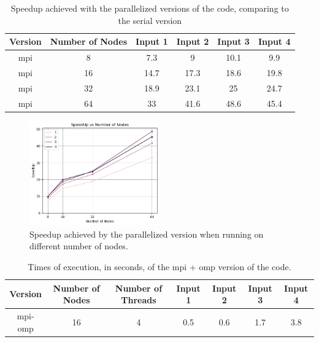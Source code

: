 \documentclass{article}
\begin{document}
\begin{table}[h!]
	\centering
	\begin{tabular}{||c c c c c c||} 
	 \hline
	 Version & Number of Nodes & Input 1 & Input 2 & Input 3 & Input 4\\ [0.5ex] 
	 \hline\hline
	 mpi & 8 & 7.3 & 9 & 10.1 & 9.9 \\ 
	 mpi & 16 & 14.7 & 17.3 & 18.6 & 19.8  \\
	 mpi & 32 & 18.9 & 23.1 & 25 & 24.7 \\
	 mpi & 64 & 33 & 41.6 & 48.6 & 45.4 \\ [1ex] 
	 \hline
	\end{tabular}
	\caption{Speedup achieved with the parallelized versions of the code, comparing to the serial version}
	\label{speedup}
\end{table}

\begin{figure}[htbp]
    \centering
    \includegraphics[width=0.5\textwidth]{img/speedup.png}
    \caption{Speedup achieved by the parallelized version when running on different number of nodes.}
    \label{speedup-graph}
\end{figure}

\begin{table}[h!]
	\centering
	\begin{tabular}{||c c c c c c c||} 
	 \hline
	 Version & Number of Nodes & Number of Threads & Input 1 & Input 2 & Input 3 & Input 4\\ [0.5ex] 
	 \hline\hline
	 mpi-omp & 16 & 4 & 0.5 & 0.6 & 1.7 & 3.8 \\  [1ex] 
	 \hline
	\end{tabular}
	\caption{Times of execution, in seconds, of the mpi + omp version of the code.}
	\label{times-mpi-omp}
\end{table}


\newpage



% 

\end{document}
